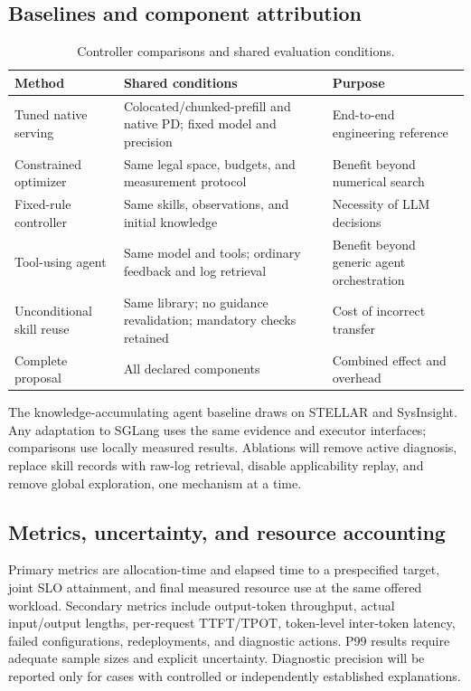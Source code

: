 \documentclass[preprint,12pt]{elsarticle}
\begin{document}
\subsection{Baselines and component attribution}
\begin{table}[H]
\centering\small
\begin{tabularx}{\linewidth}{@{}>{\raggedright\arraybackslash}p{36mm}YY@{}}
\toprule
Method & Shared conditions & Purpose \\
\midrule
Tuned native serving & Colocated/chunked-prefill and native PD; fixed model and precision & End-to-end engineering reference \\
Constrained optimizer & Same legal space, budgets, and measurement protocol & Benefit beyond numerical search \\
Fixed-rule controller & Same skills, observations, and initial knowledge & Necessity of LLM decisions \\
Tool-using agent & Same model and tools; ordinary feedback and log retrieval & Benefit beyond generic agent orchestration \\
Unconditional skill reuse & Same library; no guidance revalidation; mandatory checks retained & Cost of incorrect transfer \\
Complete proposal & All declared components & Combined effect and overhead \\
\bottomrule
\end{tabularx}
\caption{Controller comparisons and shared evaluation conditions.}
\end{table}

The knowledge-accumulating agent baseline draws on STELLAR and SysInsight. Any adaptation to SGLang uses the same evidence and executor interfaces; comparisons use locally measured results. Ablations will remove active diagnosis, replace skill records with raw-log retrieval, disable applicability replay, and remove global exploration, one mechanism at a time.

\subsection{Metrics, uncertainty, and resource accounting}
Primary metrics are allocation-time and elapsed time to a prespecified target, joint SLO attainment, and final measured resource use at the same offered workload. Secondary metrics include output-token throughput, actual input/output lengths, per-request TTFT/TPOT, token-level inter-token latency, failed configurations, redeployments, and diagnostic actions. P99 results require adequate sample sizes and explicit uncertainty. Diagnostic precision will be reported only for cases with controlled or independently established explanations.
\end{document}
